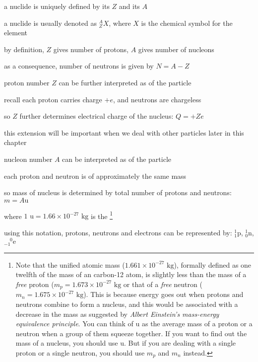 a nuclide is uniquely defined by its  $Z$ and its  $A$

a nuclide is usually denoted as $\boxed{_Z^A X}$, where $X$ is the chemical symbol for the element

\cmt by definition, $Z$ gives number of protons, $A$ gives number of nucleons

as a consequence, number of neutrons is given by $N = A-Z$

\cmt proton number $Z$ can be further interpreted as  of the particle

recall each proton carries charge $+e$, and neutrons are chargeless

so $Z$ further determines electrical charge of the nucleus: $\boxed{Q = +Ze}$

this extension will be important when we deal with other particles later in this chapter

\cmt nucleon number $A$ can be interpreted as  of the particle

each proton and neutron is of approximately the same mass

so mass of nucleus is determined by total number of protons and neutrons: $m = A\text{u}$

where $1 \text{ u} = 1.66\times10^{-27} \text{ kg}$ is the 
\footnote{Note that the unified atomic mass ($1.661\times10^{-27} \text{ kg}$), formally defined as one twelfth of the mass of an carbon-12 atom, is slightly less than the mass of a \emph{free} proton ($m_p=1.673\times10^{-27} \text{ kg}$ or that of a \emph{free} neutron ($m_n=1.675\times10^{-27} \text{ kg}$). This is because energy goes out when protons and neutrons combine to form a nucleus, and this would be associated with a decrease in the mass as suggested by \emph{Albert Einstein's mass-energy equivalence principle}. You can think of $\text{u}$ as the average mass of a proton or a neutron when a group of them squeeze together. If you want to find out the mass of a nucleus, you should use $\text{u}$. But if you are dealing with a single proton or a single neutron, you should use $m_p$ and $m_n$ instead.}

\cmt using this notation, protons, neutrons and electrons can be represented by: $ \boxed{^1_1\text{p}}$, $\boxed{^1_0\text{n}}$, $\boxed{^{\phantom{-}0}_{-1}\text{e}} $


